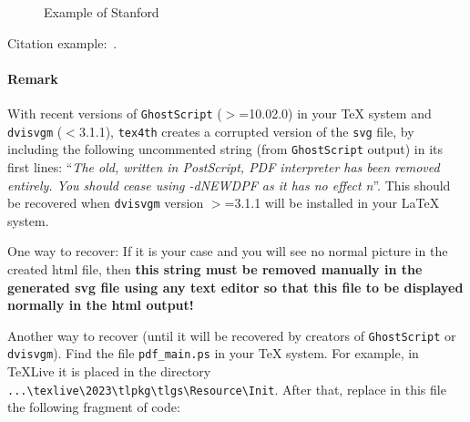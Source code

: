 \documentclass{article}
\begin{document}
\begin{figure}[!hbt]
  \caption{Example of Stanford}
\end{figure}

Citation example:~\cite{NDKKP:DSS96}.
\bigskip

\paragraph{Remark}
With recent versions of \texttt{GhostScript} ($>$=10.02.0) in your \TeX{}
system and \texttt{dvisvgm} ($<$3.1.1), \texttt{tex4th} creates a corrupted
version of the \texttt{svg} file, by including the following uncommented
string (from \texttt{GhostScript} output) in its first lines: ``\emph{The
old, written in PostScript, PDF interpreter has been removed entirely. You
should cease using -dNEWDPF as it has no effect n}''. This should be
recovered when \texttt{dvisvgm} version $>$=3.1.1 will be installed in your
\LaTeX{} system.

One way to recover: If it is your case and you will see no normal picture in
the created html file, then \textbf{this string must be removed manually in
the generated svg file using any text editor so that this file to be
displayed normally in the html output!}

Another way to recover (until it will be recovered by creators of
\texttt{GhostScript} or \texttt{dvisvgm}). Find the file \verb|pdf_main.ps|
in your \TeX{} system. For example, in TeXLive it is placed in the directory
\verb|...\texlive\2023\tlpkg\tlgs\Resource\Init|. After that, replace in this
file the following fragment of code:
\end{document}
